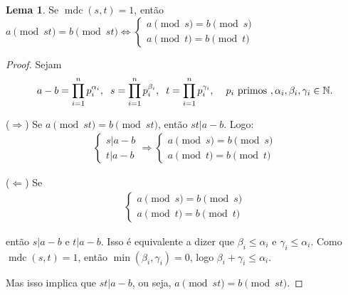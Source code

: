 \documentclass[a4paper,portuguese,11pt,twoside, leqno]{book}
\DeclareMathOperator{\mdc}{mdc}
\theoremstyle{definition}
\newtheorem{lemma}[theorem]{Lema}
\begin{document}
	
	\begin{lemma}
		\label{lema1}
		Se $\mdc(s, t) = 1$, então $a\pmod {st} = b\pmod {st} \Leftrightarrow \begin{cases}
		a\pmod s = b\pmod s \\ a\pmod t = b\pmod t
		\end{cases}$
		
	\end{lemma}
	
	\begin{proof}
		Sejam 
		\begin{align*}
		a - b = \prod_{i = 1}^{n}p_i^{\alpha_i}, \hspace{0.2cm} s = \prod_{i = 1}^{n}p_i^{\beta_i}, \hspace{0.2cm} t = \prod_{i=1}^{n}p_i^{\gamma_i}, \hspace{0.4cm} p_i\text{ primos }, \alpha_i, \beta_i, \gamma_i\in\mathbb{N}.
		\end{align*}
		
		($\Rightarrow$) Se $a\pmod {st} = b\pmod {st}$, então $st|a-b$. Logo:
		\begin{align*}
		\begin{cases}
		s|a-b \\
		t|a-b
		\end{cases}\Rightarrow
		\begin{cases}
		a\pmod s = b\pmod s\\
		a\pmod t = b\pmod t
		\end{cases}
		\end{align*}
		\par\vspace{0.3cm}($\Leftarrow$) Se 
		\begin{align*}
		\begin{cases}
		a\pmod s = b\pmod s \\
		a\pmod t = b\pmod t
		\end{cases}
		\end{align*}
		\par\vspace{0.3cm} então $s|a-b$ e $t|a-b$. Isso é equivalente a dizer que $\beta_i\leq\alpha_i$ e $\gamma_i\leq\alpha_i$. Como $\mdc(s,t) = 1$, então $\min(\beta_i, \gamma_i) = 0$, logo $\beta_i + \gamma_i \leq \alpha_i$.
		\par\vspace{0.3cm} Mas isso implica que $st|a-b$, ou seja, $a\pmod {st} = b\pmod {st}$.
		
	\end{proof}
	
\end{document}
